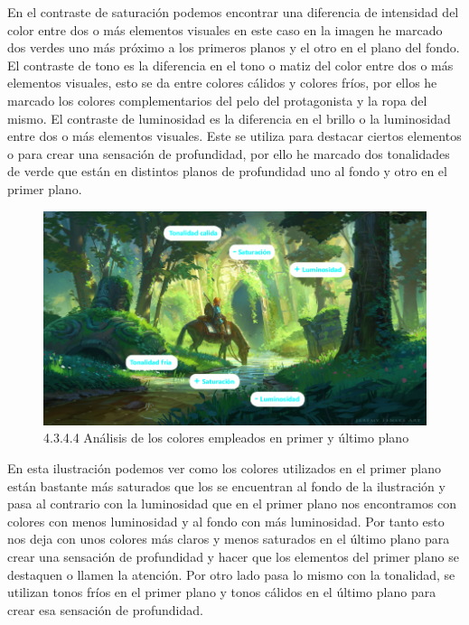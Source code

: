 \documentclass[12pt]{article}
\begin{document}
En el contraste de saturación podemos encontrar una diferencia de intensidad del color entre dos o más elementos visuales en este caso en la imagen he marcado dos verdes uno más próximo a los primeros planos y el otro en el plano del fondo. El contraste de tono es la diferencia en el tono o matiz del color entre dos o más elementos visuales, esto se da entre colores cálidos y colores fríos, por ellos he marcado los colores complementarios del pelo del protagonista y la ropa del mismo. El contraste de luminosidad es la diferencia en el brillo o la luminosidad entre dos o más elementos visuales. Este se utiliza para destacar ciertos elementos o para crear una sensación de profundidad, por ello he marcado dos tonalidades de verde que están en distintos planos de profundidad uno al fondo y otro en el primer plano.

    \begin{figure}[H]
      \centering
      \includegraphics[scale=0.7]{images/Saúl/Sección 3/EA_img3_4Color_4AnalisisPlanosPrimeroFondo.png}
      \caption{\small 4.3.4.4 Análisis de los colores empleados en primer y último plano}
    \end{figure}

En esta ilustración podemos ver como los colores utilizados en el primer plano están bastante más saturados que los se encuentran al fondo de la ilustración y pasa al contrario con la luminosidad que en el primer plano nos encontramos con colores con menos luminosidad y al fondo con más luminosidad. Por tanto esto nos deja con unos colores más claros y menos saturados en el último plano para crear una sensación de profundidad y hacer que los elementos del primer plano se destaquen o llamen la atención. Por otro lado pasa lo mismo con la tonalidad, se utilizan tonos fríos en el primer plano y tonos cálidos en el último plano para crear esa sensación de profundidad.
        \newpage
\end{document}
